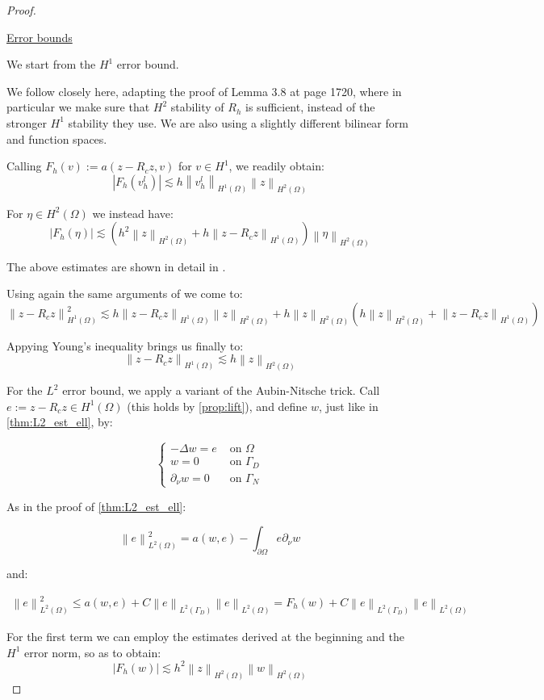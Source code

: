 \documentclass[english,a4paper,10pt,oneside]{scrbook}	%
\theoremstyle{break}
\newenvironment{mproof}[1][\proofname]{%
  \begin{proof}[#1]$ $\par\nobreak\ignorespaces
}{%
  \end{proof}
}
\renewcommand*{\proofname}{Proof}
\theoremstyle{remark}
\newcommand{\norm}[1]{\left\lVert#1\right\rVert}
\begin{document}
\begin{mproof}
\underline{Error bounds}

We start from the $H^1$ error bound.

We follow \cite{ranner} closely here, adapting the proof of Lemma 3.8 at page 1720, where in particular we make sure that $H^2$ stability of $R_h$ is sufficient, instead of the stronger $H^1$ stability they use. We are also using a slightly different bilinear form and function spaces.

Calling $F_h(v):=a(z-R_cz, v)$ for $v \in H^1$, we readily obtain:
$$|F_h(v_h^l)|\lesssim h \norm{v_h^l}_{H^1(\Omega)}\norm{z}_{H^2(\Omega)}$$

For $\eta \in H^2(\Omega)$ we instead have:
$$|F_h(\eta)|\lesssim \left ( h^2 \norm{z}_{H^2(\Omega)}+ h \norm{z-R_cz}_{H^1(\Omega)}\right)\norm{\eta}_{H^2(\Omega)}$$

The above estimates are shown in detail in \cite{ranner}.

Using again the same arguments of \cite{ranner} we come to:
$$\norm{z-R_cz}^2_{H^1(\Omega)}\lesssim h \norm{z-R_cz}_{H^1(\Omega)} \norm{z}_{H^2(\Omega)} + h \norm{z}_{H^2(\Omega)}(h\norm{z}_{H^2(\Omega)}+\norm{z-R_cz}_{H^1(\Omega)})$$

Appying Young's inequality brings us finally to:
$$\norm{z-R_cz}_{H^1(\Omega)}\lesssim h \norm{z}_{H^2(\Omega)} $$

For the $L^2$ error bound, we apply a variant of the Aubin-Nitsche trick. Call $e:= z - R_c z \in H^1(\Omega)$ (this holds by \cref{prop:lift}), and define $w$, just like in \cref{thm:L2_est_ell}, by:

$$
\left\{\begin{matrix}
-\Delta w = e & \text{ on } \Omega \\ 
w = 0 & \text{ on } \Gamma_D \\ 
\partial_\nu w = 0 & \text{ on } \Gamma_N 
\end{matrix}\right.
$$

As in the proof of \cref{thm:L2_est_ell}:

$$\norm{e}^2_{L^2(\Omega)} = a(w,e) - \int_{\partial \Omega} e \partial_\nu w  $$

and:

\begin{align*}
\norm{e}^2_{L^2(\Omega)} \leq a(w,e) + C \norm{e}_{L^2(\Gamma_D)}\norm{e}_{L^2( \Omega)} = F_h(w) + C \norm{e}_{L^2(\Gamma_D)}\norm{e}_{L^2( \Omega)}
\end{align*}

For the first term we can employ the estimates derived at the beginning and the $H^1$ error norm, so as to obtain:
$$|F_h(w)|\lesssim h^2\norm{z}_{H^2(\Omega)}\norm{w}_{H^2(\Omega)}$$


\end{mproof}
\end{document}
